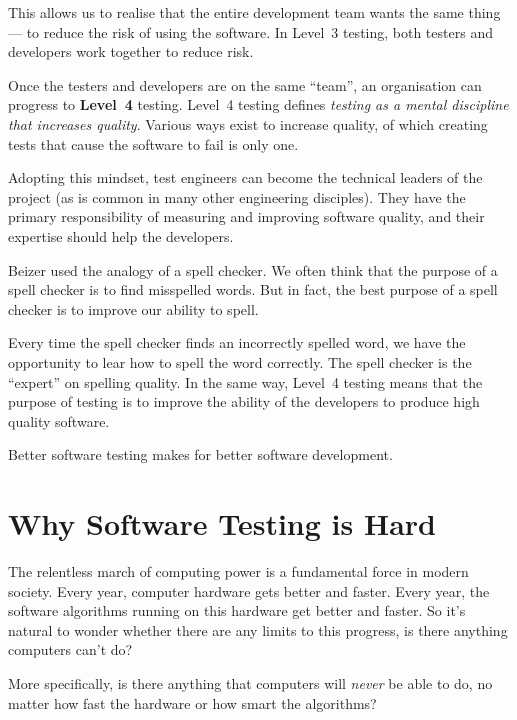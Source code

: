 This allows us to realise that the entire development team wants the same thing
--- to reduce the risk of using the software. In Level~3 testing, both testers
and developers work together to reduce risk.

Once the testers and developers are on the same ``team'', an organisation can
progress to {\bf Level~4} testing. Level~4 testing defines {\it testing as a
mental discipline that increases quality}. Various ways exist to increase
quality, of which creating tests that cause the software to fail is only one.

Adopting this mindset, test engineers can become the technical leaders of the
project (as is common in many other engineering disciples). They have the
primary responsibility of measuring and improving software quality, and their
expertise should help the developers.

Beizer used the analogy of a spell checker. We often think that the purpose of a
spell checker is to find misspelled words. But in fact, the best purpose of a
spell checker is to improve our ability to spell.

Every time the spell checker finds an incorrectly spelled word, we have the
opportunity to lear how to spell the word correctly.  The spell checker is the
``expert'' on spelling quality. In the same way, Level~4 testing means that the
purpose of testing is to improve the ability of the developers to produce high
quality software.

Better software testing makes for better software development.



\section{Why Software Testing is Hard}


The relentless march of computing power is a fundamental force in modern
society.
%
Every year, computer hardware gets better and faster. Every year, the software
algorithms running on this hardware get better and faster. So it's natural to
wonder whether there are any limits to this progress, is there anything
computers can't do?

More specifically, is there anything that computers will {\it never} be able to
do, no matter how fast the hardware or how smart the algorithms?

